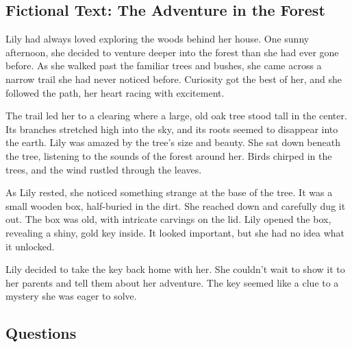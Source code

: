 \documentclass[12pt]{article}
\begin{document}
\onehalfspacing


\subsection*{Fictional Text: The Adventure in the Forest}

\begin{tcolorbox}[colframe=black!40, colback=gray!5]

\begin{spacing}{1.15}
    Lily had always loved exploring the woods behind her house. One sunny afternoon, she decided to venture deeper into the forest than she had ever gone before. As she walked past the familiar trees and bushes, she came across a narrow trail she had never noticed before. Curiosity got the best of her, and she followed the path, her heart racing with excitement.

    The trail led her to a clearing where a large, old oak tree stood tall in the center. Its branches stretched high into the sky, and its roots seemed to disappear into the earth. Lily was amazed by the tree’s size and beauty. She sat down beneath the tree, listening to the sounds of the forest around her. Birds chirped in the trees, and the wind rustled through the leaves.

    As Lily rested, she noticed something strange at the base of the tree. It was a small wooden box, half-buried in the dirt. She reached down and carefully dug it out. The box was old, with intricate carvings on the lid. Lily opened the box, revealing a shiny, gold key inside. It looked important, but she had no idea what it unlocked.

    Lily decided to take the key back home with her. She couldn’t wait to show it to her parents and tell them about her adventure. The key seemed like a clue to a mystery she was eager to solve.

\end{spacing}

\end{tcolorbox}

\vspace{1cm}


\subsection*{Questions}
\end{document}
